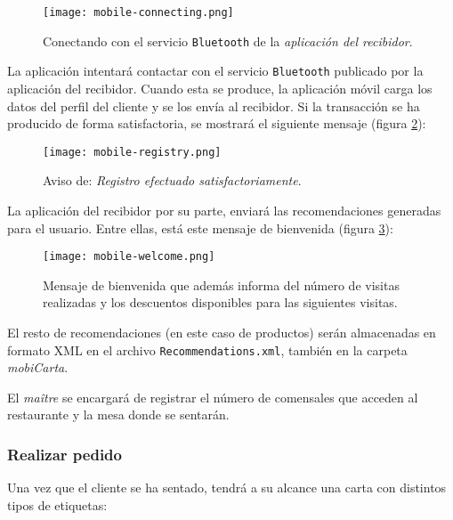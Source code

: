   \begin{figure}[H]
    \begin{center}
      \texttt{[image: mobile-connecting.png]}
      \caption{Conectando con el servicio \texttt{Bluetooth} de la
      \emph{aplicación del recibidor}.}
      \label{fig:mobile-connecting}
    \end{center}
  \end{figure}

La aplicación intentará contactar con el servicio \texttt{Bluetooth} publicado
por la aplicación del recibidor. Cuando esta se produce, la aplicación móvil
carga los datos del perfil del cliente y se los envía al recibidor. Si la
transacción se ha producido de forma satisfactoria, se mostrará el siguiente
mensaje (figura \ref{fig:mobile-registry}):

  \begin{figure}[H]
    \begin{center}
      \texttt{[image: mobile-registry.png]}
      \caption{Aviso de: \emph{Registro efectuado satisfactoriamente}.}
      \label{fig:mobile-registry}
    \end{center}
  \end{figure}

La aplicación del recibidor por su parte, enviará las recomendaciones
generadas para el usuario. Entre ellas, está este mensaje de bienvenida
(figura \ref{fig:mobile-welcome}):

  \begin{figure}[H]
    \begin{center}
      \texttt{[image: mobile-welcome.png]}
      \caption{Mensaje de bienvenida que además informa del número de visitas
      realizadas y los descuentos disponibles para las siguientes visitas.}
      \label{fig:mobile-welcome}
    \end{center}
  \end{figure}

El resto de recomendaciones (en este caso de productos) serán almacenadas 
en formato \acs{XML} en el archivo \texttt{Recommendations.xml}, también
en la carpeta \emph{mobiCarta}.

El \emph{maître} se encargará de registrar el número de comensales que
acceden al restaurante y la mesa donde se sentarán.

\subsubsection{Realizar pedido}
Una vez que el cliente se ha sentado, tendrá a su alcance una carta con
distintos tipos de etiquetas:

